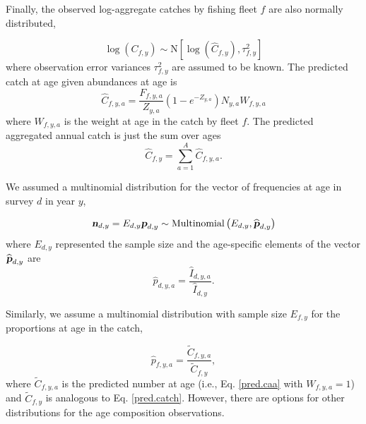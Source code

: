 \documentclass[12pt,letterpaper, leqno]{article}
\begin{document}
Finally, the observed log-aggregate catches by fishing fleet $f$ are also normally distributed,

\vspace{-12pt}
\begin{equation*}
\log\left(C_{f,y}\right) \sim \text{N}\left[\log\left(\widehat C_{f,y}\right), \tau^2_{f,y}\right]
\end{equation*}
where observation error variances $\tau^2_{f,y}$ are assumed to be known. The predicted catch at age given abundances at age is
\begin{equation}\label{pred.caa}
\widehat C_{f,y,a} = \frac{F_{f,y,a}}{Z_{y,a}}\left(1 - e^{-Z_{y,a}}\right) N_{y,a} W_{f,y,a}
\end{equation}
where $W_{f,y,a}$ is the weight at age in the catch by fleet $f$. The predicted aggregated annual catch is just the sum over ages
\begin{equation}\label{pred.catch}
\widehat C_{f,y} = \sum^A_{a=1} \widehat C_{f,y,a}.
\end{equation}

We assumed a multinomial distribution for the vector of frequencies at age in survey $d$ in year $y$, 

\vspace{-12pt}
\begin{equation}\label{multinom.dist}
\textbf{\textsl{n}}_{d,y} = E_{d,y} \textsl{\textbf{p}}_{d,y} \sim \text{Multinomial}\left(E_{d,y}, \widehat {\textsl{\textbf{p}}} _{d,y}\right)
\end{equation}
where $E_{d,y}$ represented the sample size and the age-specific elements of the vector $\widehat {\textsl{\textbf{p}}} _{d,y}$ are
\vspace{-12pt}
\begin{equation*}
  \widehat p_{d,y,a} = \frac{\widehat I_{d,y,a}}{\widehat I_{d,y}}.
\end{equation*}

Similarly, we assume a multinomial distribution with sample size $E_{f,y}$ for the proportions at age in the catch,

\vspace{-12pt}
\begin{equation*}
  \widehat p_{f,y,a} = \frac{\widetilde C_{f,y,a}}{\widetilde C_{f,y}},
\end{equation*}
where $\widetilde C_{f,y,a}$ is the predicted number at age (i.e., Eq. \ref{pred.caa} with $W_{f,y,a} = 1$) and $\widetilde C_{f,y}$ is analogous to Eq. \ref{pred.catch}. However, there are options for other distributions for the age composition observations.
\end{document}
